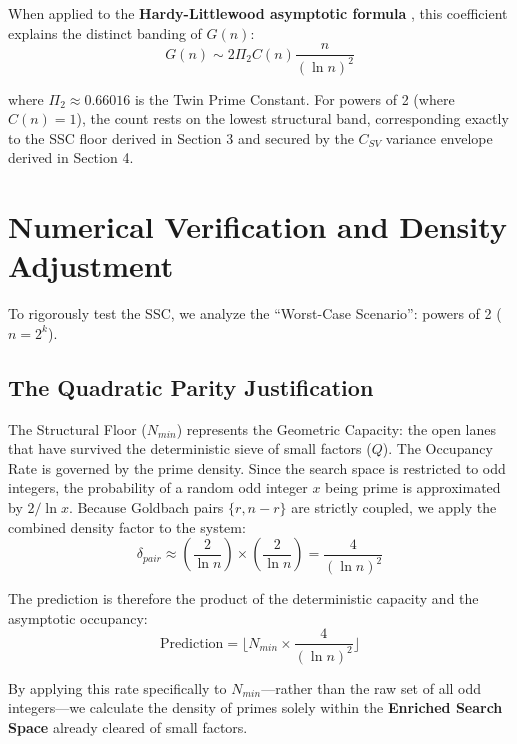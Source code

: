 \documentclass[twoside,9pt]{extarticle}
\begin{document}
When applied to the \textbf{Hardy-Littlewood asymptotic formula} \cite{hardy1923}, this coefficient explains the distinct banding of $G(n)$:
\begin{equation}
\label{eq:hardy_littlewood}
G(n) \sim 2 \Pi_2 C(n) \frac{n}{(\ln n)^2}
\end{equation}

where $\Pi_2 \approx 0.66016$ is the Twin Prime Constant. For powers of 2 (where $C(n)=1$), the count rests on the lowest structural band, corresponding exactly to the SSC floor derived in Section 3 and secured by the $C_{SV}$ variance envelope derived in Section 4.

\section{Numerical Verification and Density Adjustment}
\label{sec:verification}

To rigorously test the SSC, we analyze the ``Worst-Case Scenario'': powers of 2 ($n=2^k$).

\subsection{The Quadratic Parity Justification}
\label{subsec:quadratic_parity}

The Structural Floor ($N_{min}$) represents the Geometric Capacity: the open lanes that have survived the deterministic sieve of small factors ($Q$). The Occupancy Rate is governed by the prime density. Since the search space is restricted to odd integers, the probability of a random odd integer $x$ being prime is approximated by $2/\ln x$. Because Goldbach pairs $\{r, n-r\}$ are strictly coupled, we apply the combined density factor to the system:
\begin{equation}
\delta_{pair} \approx \left( \frac{2}{\ln n} \right) \times \left( \frac{2}{\ln n} \right) = \frac{4}{(\ln n)^2}
\end{equation}

The prediction is therefore the product of the deterministic capacity and the asymptotic occupancy:
\begin{equation}
\text{Prediction} = \lfloor N_{min} \times \frac{4}{(\ln n)^2} \rfloor
\end{equation}

By applying this rate specifically to $N_{min}$—rather than the raw set of all odd integers—we calculate the density of primes solely within the \textbf{Enriched Search Space} already cleared of small factors.
\end{document}
